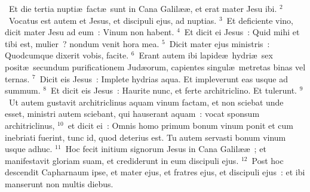 ~Et die tertia nupti\ae\ fact\ae\ sunt in Cana Galil\ae \ae , et erat mater Jesu ibi.
${}^{2}$~Vocatus est autem et Jesus, et discipuli ejus, ad nuptias.
${}^{3}$~Et deficiente vino, dicit mater Jesu ad eum~: Vinum non habent.
${}^{4}$~Et dicit ei Jesus~: Quid mihi et tibi est, mulier~? nondum venit hora mea.
${}^{5}$~Dicit mater ejus ministris~: Quodcumque dixerit vobis, facite.
${}^{6}$~Erant autem ibi lapide\ae\ hydri\ae\ sex posit\ae\ secundum purificationem Jud\ae orum, capientes singul\ae\ metretas binas vel ternas.
${}^{7}$~Dicit eis Jesus~: Implete hydrias aqua. Et impleverunt eas usque ad summum.
${}^{8}$~Et dicit eis Jesus~: Haurite nunc, et ferte architriclino. Et tulerunt.
${}^{9}$~Ut autem gustavit architriclinus aquam vinum factam, et non sciebat unde esset, ministri autem sciebant, qui hauserant aquam~: vocat sponsum architriclinus,
${}^{10}$~et dicit ei~: Omnis homo primum bonum vinum ponit et cum inebriati fuerint, tunc id, quod deterius est. Tu autem servasti bonum vinum usque adhuc.
${}^{11}$~Hoc fecit initium signorum Jesus in Cana Galil\ae \ae~; et manifestavit gloriam suam, et crediderunt in eum discipuli ejus.
${}^{12}$~Post hoc descendit Capharnaum ipse, et mater ejus, et fratres ejus, et discipuli ejus~: et ibi manserunt non multis diebus.


